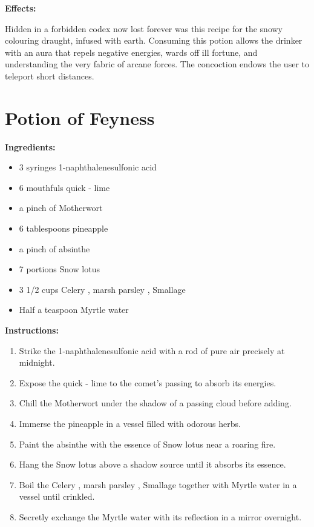 \documentclass{article}
\begin{document}
\textbf{Effects:}

Hidden in a forbidden codex now lost forever was this recipe for the snowy colouring draught, infused with earth. Consuming this potion allows the drinker with an aura that repels negative energies, wards off ill fortune, and understanding the very fabric of arcane forces. The concoction endows the user to teleport short distances.

\newpage
\section*{Potion of Feyness}

\textbf{Ingredients:}

\begin{itemize}
  \item 3 syringes 1-naphthalenesulfonic acid
  \item 6 mouthfuls quick - lime
  \item a pinch of Motherwort
  \item 6 tablespoons pineapple
  \item a pinch of absinthe
  \item 7 portions Snow lotus
  \item 3 1/2 cups Celery , marsh parsley , Smallage
  \item Half a teaspoon Myrtle water
\end{itemize}

\textbf{Instructions:}

\begin{enumerate}
  \item Strike the 1-naphthalenesulfonic acid with a rod of pure air precisely at midnight.
  \item Expose the quick - lime to the comet’s passing to absorb its energies.
  \item Chill the Motherwort under the shadow of a passing cloud before adding.
  \item Immerse the pineapple in a vessel filled with odorous herbs.
  \item Paint the absinthe with the essence of Snow lotus near a roaring fire.
  \item Hang the Snow lotus above a shadow source until it absorbs its essence.
  \item Boil the Celery , marsh parsley , Smallage together with Myrtle water in a vessel until crinkled.
  \item Secretly exchange the Myrtle water with its reflection in a mirror overnight.
\end{enumerate}
\end{document}
